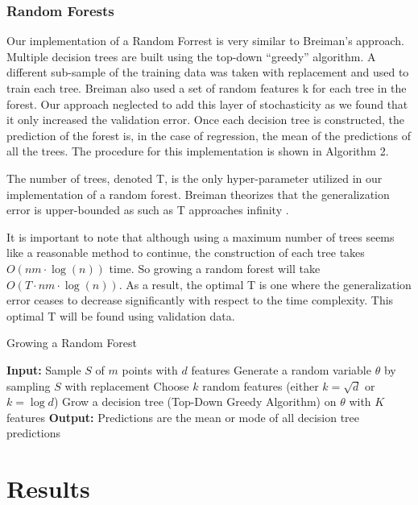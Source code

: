 \documentclass{article}
\begin{document}
\subsubsection{Random Forests}

Our implementation of a Random Forrest is very similar to Breiman’s approach. Multiple decision trees are built using the top-down “greedy” algorithm. A different sub-sample of the training data was taken with replacement and used to train each tree. Breiman also used a set of random features k for each tree in the forest. Our approach neglected to add this layer of stochasticity as we found that it only increased the validation error. Once each decision tree is constructed, the prediction of the forest is, in the case of regression, the mean of the predictions of all the trees. The procedure for this implementation is shown in Algorithm 2.

The number of trees, denoted T, is the only hyper-parameter utilized in our implementation of a random forest. Breiman theorizes that the generalization error is upper-bounded as such as T approaches infinity \cite{Breiman}.

It is important to note that although using a maximum number of trees seems like a reasonable method to continue, the construction of each tree takes $O(n m \cdot{} \log(n))$ time. So growing a random forest will take $O(T \cdot{} n m \cdot{} \log(n))$. As a result, the optimal T is one where the generalization error ceases to decrease significantly with respect to the time complexity. This optimal T will be found using validation data.


\begin{algorithm}[ht]
\caption{Growing a Random Forest}
\begin{algorithmic}[1]
\State \textbf{Input:} Sample $S$ of $m$ points with $d$ features
 
    \State Generate a random variable $\theta$ by sampling $S$ with replacement
    \State Choose $k$ random features (either $k = \sqrt{d}$ or $k = \log{d}$)
    \State Grow a decision tree (Top-Down Greedy Algorithm) on $\theta$ with $K$ features
\EndFor
\State \textbf{Output:} Predictions are the mean or mode of all decision tree predictions
\end{algorithmic}
\end{algorithm}




\section{Results}
\label{others}
\end{document}
